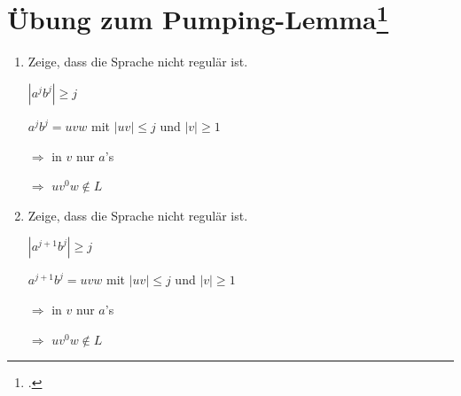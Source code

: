 \documentclass{lehramt-informatik-aufgabe}
\begin{document}
\section{Übung zum Pumping-Lemma\footcite[Seite 65]{theo:fs:1}
}

\begin{enumerate}

%

\item Zeige, dass die Sprache  nicht
regulär ist.

\begin{liAntwort}
$|a^j b^j| \geq j$

$a^j b^j = uvw$
mit $|uv| \leq j$
und $|v| \geq 1$

$\Rightarrow$ in $v$ nur $a$’s

$\Rightarrow$ $uv^0w \notin L$
\end{liAntwort}

%

\item Zeige, dass die Sprache  nicht
regulär ist.

\begin{liAntwort}
$|a^{j+1} b^j| \geq j $

$a^{j+1} b^j = uvw$
mit $|uv| \leq j$
und $|v| \geq 1$

$\Rightarrow$ in $v$ nur $a$’s

$\Rightarrow$ $uv^0w \notin L$
\end{liAntwort}
\end{enumerate}
\end{document}
